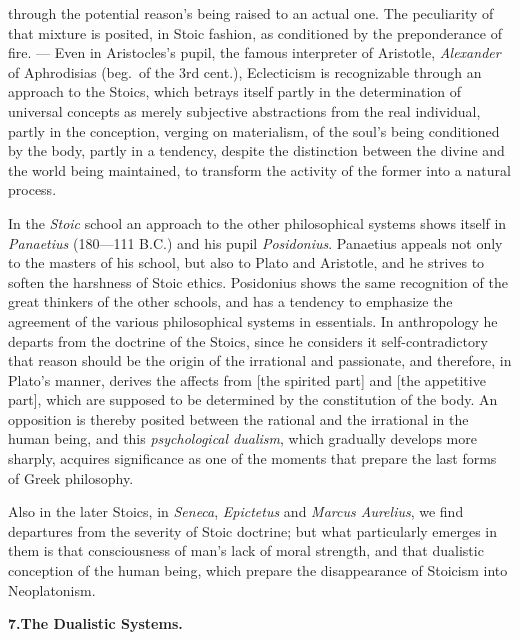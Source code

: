 through the potential reason's being raised to an actual one. The
peculiarity of that mixture is posited, in Stoic fashion, as conditioned by the preponderance of fire. --- Even in Aristocles's pupil,
the famous interpreter of Aristotle, \emph{Alexander} of Aphrodisias (beg.\ of the 3rd cent.), Eclecticism is recognizable through
an approach to the Stoics, which betrays itself partly in the determination of universal concepts as merely subjective abstractions
from the real individual, partly in the conception, verging on materialism, of the soul's being conditioned by the body, partly in a
tendency, despite the distinction between the divine  and the world being maintained, to transform the activity of the former
into a natural process.

In the \emph{Stoic} school an approach to the other
philosophical systems shows itself in \emph{Panaetius} (180---111 B.C.) and
his pupil \emph{Posidonius}. Panaetius appeals not only
to the masters of his school, but also to Plato and Aristotle,
and he strives to soften the harshness of Stoic ethics. Posidonius shows the same recognition of the great thinkers of the other schools,
and has a tendency to emphasize the agreement of the various philosophical systems in essentials. In anthropology he departs from the doctrine of the Stoics,
since he considers it self-contradictory that reason should
be the origin of the irrational and passionate, and therefore,
in Plato's manner, derives the affects from  [the spirited part] and  [the appetitive part], which are supposed to be determined by the constitution of the body. An opposition is thereby posited between the
rational and the irrational in the human being, and this
\emph{psychological dualism}, which gradually develops
more sharply, acquires significance as one of the moments that prepare the last forms of Greek philosophy.

Also in the later Stoics, in \emph{Seneca}, \emph{Epictetus} and \emph{Marcus Aurelius}, we find departures from the severity of Stoic doctrine; but what particularly emerges in them is that consciousness of man's lack of
moral strength, and that dualistic conception of the human being, which prepare the disappearance of Stoicism into Neoplatonism.

\divrule

\begin{center}
\textbf{7.\enspace The Dualistic Systems.}
\end{center}

